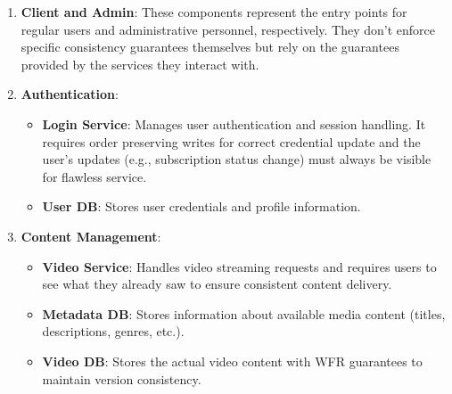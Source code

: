 \begin{enumerate}[leftmargin=*,noitemsep,topsep=2pt]
  \item \textbf{Client and Admin}: These components represent the
    entry points for regular users and administrative personnel,
    respectively. They don't enforce specific consistency guarantees
    themselves but rely on the guarantees provided by the services
    they interact with.

  \item \textbf{Authentication}:
    \begin{itemize}[leftmargin=*, noitemsep,topsep=0pt]
      \item \textbf{Login Service}: Manages user authentication and
        session handling. It requires order preserving writes
        for correct credential update and the user's updates
        (e.g., subscription status change) must always be visible for
        flawless service.
      \item \textbf{User DB}: Stores user credentials and
        profile information.
    \end{itemize}

  \item \textbf{Content Management}:
    \begin{itemize}[leftmargin=*, noitemsep,topsep=0pt]
      \item \textbf{Video Service}: Handles video streaming requests
        and requires users to see what they already saw to ensure
        consistent content delivery.
      \item \textbf{Metadata DB}: Stores information about
        available media content (titles, descriptions, genres, etc.).
      \item \textbf{Video DB}: Stores the actual video content
        with WFR guarantees to maintain version consistency.
    \end{itemize}


\end{enumerate}
